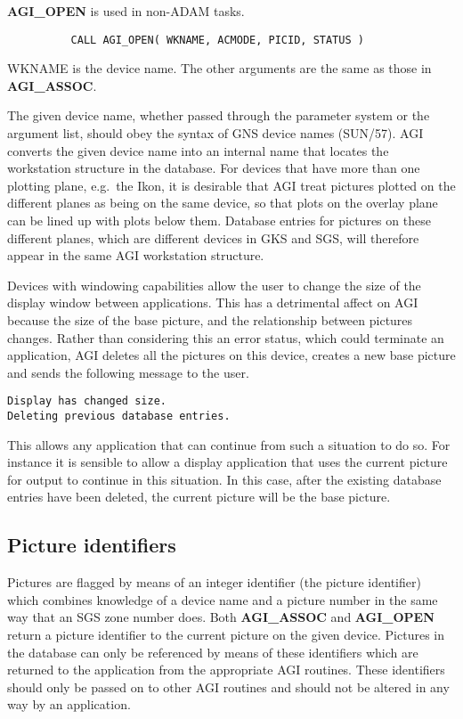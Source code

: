 {\bf AGI\_OPEN} is used in non-ADAM tasks.
\begin{verbatim}
          CALL AGI_OPEN( WKNAME, ACMODE, PICID, STATUS )
\end{verbatim}
WKNAME is the device name. The other arguments are the same as those in
{\bf AGI\_ASSOC}.

The given device name, whether passed through the parameter system or the
argument list, should obey the syntax of GNS device names (SUN/57).
AGI converts the given device name into an internal name that locates
the workstation structure in the database. For devices that have more than
one plotting plane, e.g.\ the Ikon,
it is desirable that AGI treat pictures plotted on the different planes as
being on the same device, so that plots on the overlay plane can be lined up
with plots below them.
Database entries for pictures on these different planes, which are different
devices in GKS and SGS, will therefore appear in the same AGI workstation
structure.

Devices with windowing capabilities allow the user to change the size of the
display window between applications. This has a detrimental affect on AGI
because the size of the base picture, and the relationship between pictures
changes. Rather than considering this an error status, which could terminate
an application, AGI deletes all the pictures on this device, creates a
new base picture and sends the following message to the user.
\begin{verbatim}
Display has changed size.
Deleting previous database entries.
\end{verbatim}
This allows any application that can continue from such a situation to do so.
For instance it is sensible to allow a display application that uses the
current picture for output to continue in this situation. In this case, after
the existing database entries have been deleted, the current picture will be
the base picture.

\subsection{Picture identifiers}

Pictures are flagged by means of an integer identifier (the picture
identifier) which combines knowledge of a device name and a picture
number in the same way that an SGS zone number does. Both {\bf AGI\_ASSOC}
and {\bf AGI\_OPEN} return a picture identifier to the current picture on
the given device. Pictures in the database can only be referenced by means
of these identifiers which are returned to the application from the
appropriate AGI routines. These identifiers should only be passed on to
other AGI routines and should not be altered in any way by an application.

